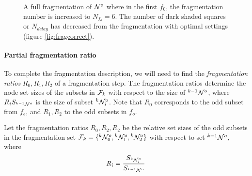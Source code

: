 \begin{figure}
  \caption{A full fragmentation of $\mathcal{N}^o$ where in the first $f_0$, the fragmentation number is increased to $N_{f_o} = 6$. The number of dark shaded squares or $N_{delay}$ has decreased from the fragmentation with optimal settings (figure \ref{fig:fragcorrect}). }\label{fig:fragfnumber}
\end{figure}

\paragraph{Partial fragmentation ratio}
To complete the fragmentation description, we will need to find the \emph{fragmentation ratios} $R_0, R_1, R_2$ of a fragmentation step. The fragmentation ratios determine the node set sizes of the subsets in $\mathcal{F}_{k}$ with respect to the size of ${}^{k-1}\mathcal{N}^o$, where $R_i S_{{}^{k-1}\mathcal{N}^o}$ is the size of subset ${}^{k}\mathcal{N}^o_i$. Note that $R_0$ corresponds to the odd subset from $f_e$, and $R_1, R_2$ to the odd subsets in $f_o$.

\begin{lemma}\label{lem:fragratio}
  Let the fragmentation ratios $R_0, R_2, R_2$ be the relative set sizes of the odd subsets in the fragmentation set $\mathcal{F}_{k} = \{{}^{k}\mathcal{N}^o_0, {}^{k}\mathcal{N}^{o}_1, {}^{k}\mathcal{N}^{o}_2 \}$ with respect to set ${}^{k-1}\mathcal{N}^o$, where
  \begin{equation}\label{eq:fragratio}
    R_i = \frac{S_{{}^{k}\mathcal{N}^o_i}}{S_{{}^{k-1}\mathcal{N}^o}}
  \end{equation}
\end{lemma}

